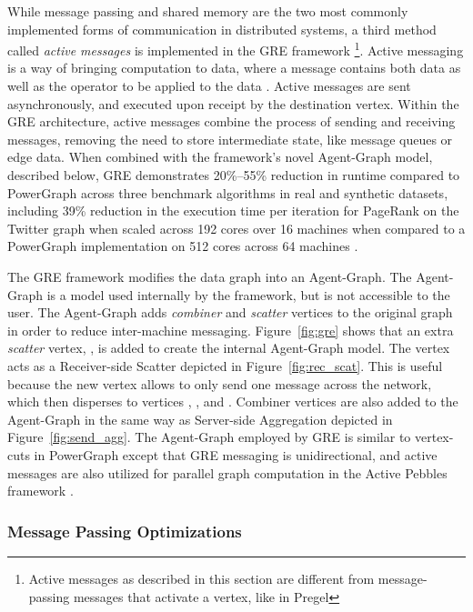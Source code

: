 \documentclass[reprint,twocolumn,showpacs,preprintnumbers,amsmath, aps,pre,amssymb]{revtex4-1}
\begin{document}
While message passing and shared memory are the two most commonly implemented forms of communication in distributed systems, a third method called {\em active messages} is implemented in the GRE framework \cite{Yan2013}\footnote{Active messages as described in this section are different from message-passing messages that activate a vertex, like in Pregel}.  Active messaging is a way of bringing computation to data, where a message contains both data as well as the operator to be applied to the data \cite{VonEicken1992}.  Active messages are sent asynchronously, and executed upon receipt by the destination vertex.  Within the GRE architecture, active messages combine the process of sending and receiving messages, removing the need to store intermediate state, like message queues or edge data.  When combined with the framework's novel Agent-Graph model, described below, GRE demonstrates 20\%--55\% reduction in runtime compared to PowerGraph across three benchmark algorithms in real and synthetic datasets, including 39\% reduction in the execution time per iteration for PageRank on the Twitter graph when scaled across 192 cores over 16 machines when compared to a PowerGraph implementation on 512 cores across 64 machines \cite{Yan2013}.

The GRE framework modifies the data graph into an Agent-Graph.  The Agent-Graph is a model used internally by the framework, but is not accessible to the user.  The Agent-Graph adds \textit{combiner} and \textit{scatter} vertices to the original graph in order to reduce inter-machine messaging.  Figure~\ref{fig:gre} shows that an extra \textit{scatter} vertex, , is added to create the internal Agent-Graph model. The  vertex acts as a Receiver-side Scatter depicted in Figure~\ref{fig:rec_scat}.  This is useful because the new  vertex allows  to only send one message across the network, which  then disperses to vertices , , and .  Combiner vertices are also added to the Agent-Graph in the same way as Server-side Aggregation depicted in Figure~\ref{fig:send_agg}.  The Agent-Graph employed by GRE is similar to vertex-cuts in PowerGraph except that GRE messaging is unidirectional, and active messages are also utilized for parallel graph computation in the Active Pebbles framework \cite{Willcock2011,Edmonds2013}.

\subsubsection{Message Passing Optimizations}
\label{subsubsec:opts}
\end{document}
